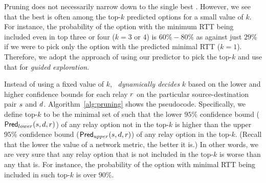 %
%
%
%

 Pruning does not necessarily narrow down to the single best \option. However, we see that the best \option is often among the top-$k$ %
predicted options for a small value of $k$. For instance, the probability of the option with the minimum RTT being included even in top three or four ($k=3$ or $4$) is $60\%-80\%$ as against just $29\%$ if we were to pick only the option with the predicted minimal RTT ($k=1$). Therefore, we adopt the approach of using our predictor to pick the top-$k$ \options and use that for {\em guided exploration}.



Instead of using a fixed value of $k$, \hybrid \ {\em dynamically decides} $k$ based on the lower and higher confidence bounds
for each relay $r$ on the particular source-destination pair $s$ and $d$. Algorithm~\ref{alg:pruning} shows the pseudocode.
Specifically, we define top-$k$ to be the minimal set of \options such that the lower $95\%$ confidence bound (${\sf\small Pred}_{lower}(s,d,r)$) of any relay option not in the top-$k$ is higher than the upper $95\%$ confidence bound (${\sf\small Pred}_{upper}(s,d,r)$) of any relay option in the top-$k$. (Recall that the lower the value of a network metric, the better it is.) In other words, we are very sure that any relay option that is not included in the top-$k$ is worse than any that is. For instance, the probability of the option with minimal RTT being included in such top-$k$ is over $90\%$.


